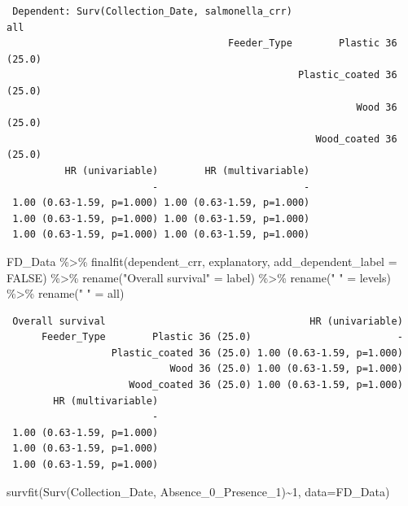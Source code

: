 \documentclass[
  letterpaper,
  DIV=11,
  numbers=noendperiod]{scrartcl}
\newenvironment{Shaded}{}{}
\newcommand{\AttributeTok}[1]{\textcolor[rgb]{0.84,0.23,0.29}{#1}}
\newcommand{\ConstantTok}[1]{\textcolor[rgb]{0.00,0.36,0.77}{#1}}
\newcommand{\DecValTok}[1]{\textcolor[rgb]{0.00,0.36,0.77}{#1}}
\newcommand{\FunctionTok}[1]{\textcolor[rgb]{0.44,0.26,0.76}{#1}}
\newcommand{\NormalTok}[1]{\textcolor[rgb]{0.14,0.16,0.18}{#1}}
\newcommand{\OtherTok}[1]{\textcolor[rgb]{0.44,0.26,0.76}{#1}}
\newcommand{\SpecialCharTok}[1]{\textcolor[rgb]{0.00,0.36,0.77}{#1}}
\newcommand{\StringTok}[1]{\textcolor[rgb]{0.01,0.18,0.38}{#1}}
\begin{document}
\begin{verbatim}
 Dependent: Surv(Collection_Date, salmonella_crr)                      all
                                      Feeder_Type        Plastic 36 (25.0)
                                                  Plastic_coated 36 (25.0)
                                                            Wood 36 (25.0)
                                                     Wood_coated 36 (25.0)
          HR (univariable)        HR (multivariable)
                         -                         -
 1.00 (0.63-1.59, p=1.000) 1.00 (0.63-1.59, p=1.000)
 1.00 (0.63-1.59, p=1.000) 1.00 (0.63-1.59, p=1.000)
 1.00 (0.63-1.59, p=1.000) 1.00 (0.63-1.59, p=1.000)
\end{verbatim}

\begin{Shaded}
\begin{Highlighting}[]
\NormalTok{FD\_Data }\SpecialCharTok{\%\textgreater{}\%} 
   \FunctionTok{finalfit}\NormalTok{(dependent\_crr, explanatory, }\AttributeTok{add\_dependent\_label =} \ConstantTok{FALSE}\NormalTok{) }\SpecialCharTok{\%\textgreater{}\%} 
    \FunctionTok{rename}\NormalTok{(}\StringTok{"Overall survival"} \OtherTok{=}\NormalTok{ label) }\SpecialCharTok{\%\textgreater{}\%} 
    \FunctionTok{rename}\NormalTok{(}\StringTok{" "} \OtherTok{=}\NormalTok{ levels) }\SpecialCharTok{\%\textgreater{}\%} 
    \FunctionTok{rename}\NormalTok{(}\StringTok{"  "} \OtherTok{=}\NormalTok{ all) }
\end{Highlighting}
\end{Shaded}

\begin{verbatim}
 Overall survival                                   HR (univariable)
      Feeder_Type        Plastic 36 (25.0)                         -
                  Plastic_coated 36 (25.0) 1.00 (0.63-1.59, p=1.000)
                            Wood 36 (25.0) 1.00 (0.63-1.59, p=1.000)
                     Wood_coated 36 (25.0) 1.00 (0.63-1.59, p=1.000)
        HR (multivariable)
                         -
 1.00 (0.63-1.59, p=1.000)
 1.00 (0.63-1.59, p=1.000)
 1.00 (0.63-1.59, p=1.000)
\end{verbatim}

\begin{Shaded}
\begin{Highlighting}[]
\FunctionTok{survfit}\NormalTok{(}\FunctionTok{Surv}\NormalTok{(Collection\_Date, Absence\_0\_Presence\_1)}\SpecialCharTok{\textasciitilde{}}\DecValTok{1}\NormalTok{, }\AttributeTok{data=}\NormalTok{FD\_Data)}
\end{Highlighting}
\end{Shaded}
\end{document}
